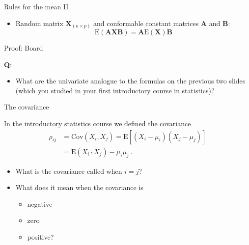 \documentclass[
  ignorenonframetext,
]{beamer}
\providecommand{\tightlist}{%
  \setlength{\itemsep}{0pt}\setlength{\parskip}{0pt}}
\begin{document}
\begin{frame}
\begin{block}{Rules for the mean II}
\protect\hypertarget{rules-for-the-mean-ii}{}
\(~\)

\begin{itemize}
\tightlist
\item
  Random matrix \(\boldsymbol{X}_{(n\times p)}\) and conformable
  constant matrices \(\boldsymbol{A}\) and \(\boldsymbol{B}\):
  \[\text{E}(\boldsymbol{A}\boldsymbol{X}\boldsymbol{B})=\boldsymbol{A}\text{E}(\boldsymbol{X})\boldsymbol{B}\]
\end{itemize}

Proof: Board

\vspace{60mm}
\end{block}
\end{frame}

\begin{frame}
\textbf{Q}:

\begin{itemize}
\tightlist
\item
  What are the univariate analogue to the formulas on the previous two
  slides (which you studied in your first introductory course in
  statistics)?
\end{itemize}

\vspace{80mm}
\end{frame}

\begin{frame}
\begin{block}{The covariance}
\protect\hypertarget{the-covariance}{}
\vspace{2mm}

In the introductory statistics course we defined the covariance
\begin{align*}
\rho_{ij} & =\text{Cov}(X_i,X_j)  =\text{E}[(X_i-\mu_i)(X_j-\mu_j)] \\
& =\text{E}(X_i \cdot X_j)-\mu_i\mu_j \ . 
\end{align*}

\begin{itemize}
\tightlist
\item
  What is the covariance called when \(i=j\)?
\end{itemize}

\vspace{2mm}

\begin{itemize}
\tightlist
\item
  What does it mean when the covariance is

  \begin{itemize}
  \tightlist
  \item
    negative
  \item
    zero
  \item
    positive?
  \end{itemize}
\end{itemize}
\end{block}
\end{frame}
\end{document}
